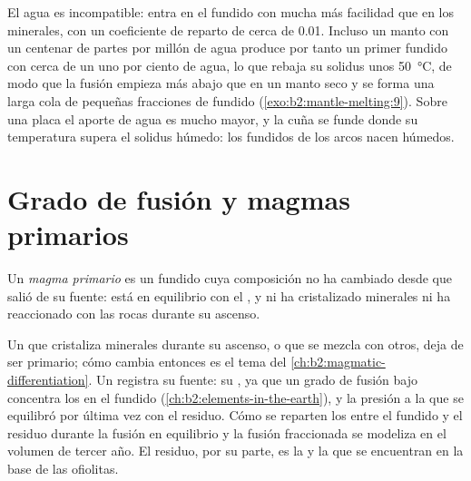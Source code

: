 El agua es incompatible: entra en el fundido con mucha más facilidad que en los minerales,
con un coeficiente de reparto de cerca de 0.01. Incluso un manto con un centenar de
partes por millón de agua produce por tanto un primer fundido con cerca de un uno por ciento de
agua, lo que rebaja su solidus unos \qty{50}{\celsius}, de modo que la fusión
empieza más abajo que en un manto seco y se forma una larga cola de pequeñas fracciones de fundido
(\cref{exo:b2:mantle-melting:9}). Sobre una placa el aporte de agua es mucho mayor, y la cuña se funde
donde su temperatura supera el solidus húmedo: los fundidos de los arcos nacen
húmedos.

\section{Grado de fusión y magmas primarios}\label{sec:b2:mantle-melting:primary}

\begin{definition}\label{def:b2:mantle-melting:primary}
Un \emph{magma primario} es un fundido cuya composición no ha
cambiado desde que salió de su fuente: está en equilibrio con el ,
y ni ha cristalizado minerales ni ha reaccionado con las rocas durante su ascenso.
\end{definition}

Un  que cristaliza minerales durante su ascenso, o que se mezcla con otros, deja de
ser primario; cómo cambia entonces es el tema del
\cref{ch:b2:magmatic-differentiation}. Un  registra su fuente: su
, ya que un grado de fusión bajo concentra los 
en el fundido (\cref{ch:b2:elements-in-the-earth}), y la presión a la que se equilibró por
última vez con el residuo. Cómo se reparten los  entre el fundido y el
residuo durante la fusión en equilibrio y la fusión fraccionada se modeliza en el volumen de tercer año. El
residuo, por su parte, es la  y la  que se encuentran en la base de las
ofiolitas.

